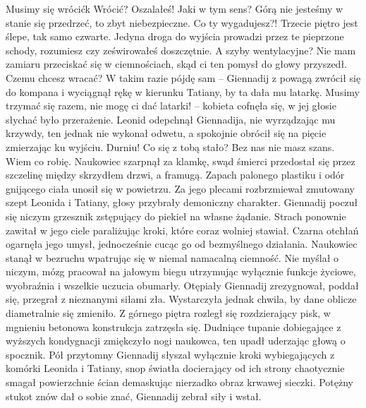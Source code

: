 \documentclass[../MAIN.tex]{subfiles}
\begin{document}
\sx Musimy się wrócić\3k 
\xx Wrócić? Oszalałeś! Jaki w tym sens? 
\xx Górą nie jesteśmy w stanie się przedrzeć, to zbyt niebezpieczne. 
\xx Co ty wygadujesz?! Trzecie piętro jest ślepe, tak samo czwarte. Jedyna droga do wyjścia prowadzi przez te pieprzone schody, rozumiesz czy ześwirowałeś doszczętnie. 
\xx A szyby wentylacyjne? 
\xx Nie mam zamiaru przeciskać się w ciemnościach, skąd ci ten pomysł do głowy przyszedł. Czemu chcesz wracać? 
\xx W takim razie pójdę sam -- Giennadij z powagą zwrócił się do kompana i wyciągnął rękę w kierunku Tatiany, by ta dała mu latarkę. 
\xx Musimy trzymać się razem, nie mogę ci dać latarki! -- kobieta cofnęła się, w jej głosie słychać było przerażenie. 
\qd
Leonid odepchnął Giennadija, nie wyrządzając mu krzywdy, ten jednak nie wykonał odwetu, a spokojnie obrócił się na pięcie zmierzając ku wyjściu. 
\sx Durniu! Co się z tobą stało? Bez nas nie masz szans. 
\xx Wiem co robię. 
\qd
Naukowiec szarpnął za klamkę, swąd śmierci przedostał się przez szczelinę między skrzydłem drzwi, a framugą. Zapach palonego plastiku i odór gnijącego ciała unosił się w powietrzu. Za jego plecami rozbrzmiewał zmutowany szept Leonida i Tatiany, głosy przybrały demoniczny charakter. Giennadij poczuł się niczym grzesznik zstępujący do piekieł na własne żądanie. Strach ponownie zawitał w jego ciele paraliżując kroki, które coraz wolniej stawiał. Czarna otchłań ogarnęła jego umysł, jednocześnie cucąc go od bezmyślnego działania. Naukowiec stanął w bezruchu wpatrując się w niemal namacalną ciemność. Nie myślał o niczym, mózg pracował na jałowym biegu utrzymując wyłącznie funkcje życiowe, wyobraźnia i wszelkie uczucia obumarły. Otępiały Giennadij zrezygnował, poddał się, przegrał z nieznanymi siłami zła. Wystarczyła jednak chwila, by dane oblicze diametralnie się zmieniło. Z górnego piętra rozległ się rozdzierający pisk, w mgnieniu betonowa konstrukcja zatrzęsła się. Dudniące tupanie dobiegające z wyższych 
kondygnacji zmiękczyło nogi naukowca, ten upadł uderzając głową o spocznik. Pół przytomny Giennadij słyszał wyłącznie kroki wybiegających z komórki Leonida i Tatiany, snop światła docierający od ich strony chaotycznie smagał powierzchnie ścian demaskując nierzadko obraz krwawej sieczki. Potężny stukot znów dał o sobie znać, Giennadij zebrał siły i wstał. 
\end{document}
